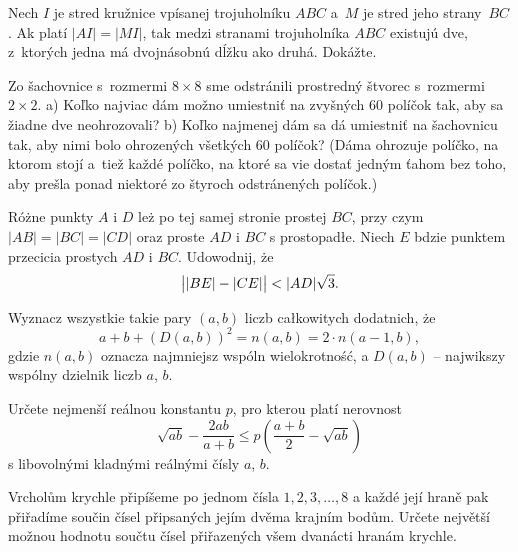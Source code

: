 {%
Nech $I$ je stred kružnice vpísanej trojuholníku $ABC$ a~$M$ je stred jeho strany~$BC$. Ak platí $|AI|=|MI|$, tak
medzi stranami trojuholníka $ABC$ existujú dve, z~ktorých jedna má dvojnásobnú dĺžku ako druhá. Dokážte.
}

{%
Zo šachovnice s~rozmermi $8\times8$ sme odstránili prostredný štvorec s~rozmermi $2\times2$.
\ite a) Koľko najviac dám možno umiestniť na zvyšných 60 políčok tak, aby sa žiadne dve neohrozovali?
\ite b) Koľko najmenej dám sa dá umiestniť na šachovnicu tak, aby nimi bolo ohrozených všetkých 60 políčok?
\endgraf\noindent
(Dáma ohrozuje políčko, na ktorom stojí a~tiež každé políčko, na ktoré sa vie dostať jedným ťahom bez toho, aby prešla ponad niektoré zo štyroch odstránených políčok.)
}

{%
Różne punkty $A$ i $D$ leż\ą{} po tej samej stronie prostej $BC$, przy czym $|AB| = |BC| = |CD|$ oraz proste $AD$ i $BC$ s\ą{} prostopad\l{}e. Niech $E$ b\ę{}dzie punktem przeci\ę{}cia prostych $AD$ i $BC$. Udowodnij, że
$$
\bigl| |BE| - |CE|\bigr| < |AD|\sqrt3.
\postdisplaypenalty=10000
$$}

{%
Wyznacz wszystkie takie pary $(a,b)$ liczb ca\l{}kowitych dodatnich, że
$$
a+b+(D(a,b))^2=n(a,b)= 2\cdot n(a-1,b),
$$
gdzie $n(a,b)$ oznacza najmniejsz\ą{} wspóln\ą{} wielokrotność, a $D(a, b)$ -- najwi\ę{}kszy wspól\-ny
dzielnik liczb $a$, $b$.}

{%
Určete nejmenší reálnou konstantu $p$, pro kterou platí nerovnost
$$
\sqrt{ab}-\frac{2ab}{a+b} \leq p\left(\frac{a+b}2-\sqrt{ab}\right)
$$
s libovolnými kladnými reálnými čísly $a$, $b$.
}

{%
Vrcholům krychle připíšeme po jednom čísla $1,2,3,\dots ,8$ a každé její hraně pak přiřadíme součin čísel připsaných jejím
dvěma krajním bodům. Určete největší možnou hodnotu součtu čísel přiřazených všem dvanácti hranám krychle.
}
